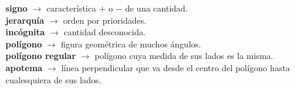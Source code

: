 \begin{defcard}
    \textbf{signo} $\rightarrow$  característica $+$ o $-$ de una cantidad. \\
    \textbf{jerarquía}	$\rightarrow$ orden por prioridades.\\
    \textbf{incógnita}	$\rightarrow$ cantidad desconocida.\\
    \textbf{polígono} $\rightarrow$ figura geométrica de muchos ángulos.\\
    \textbf{polígono regular} $\rightarrow$ polígono cuya medida de sus lados es la misma.\\
    \textbf{apotema} $\rightarrow$ línea perpendicular que va desde el centro del polígono hasta cualesquiera de sus lados.\\
\end{defcard}